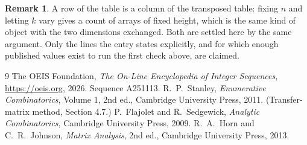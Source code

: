 \documentclass[11pt,a4paper]{article}
\theoremstyle{plain}
\theoremstyle{definition}
\newtheorem{remark}[theorem]{Remark}
\begin{document}
\begin{remark}
A row of the table is a column of the transposed table: fixing $n$ and letting $k$ vary gives a
count of arrays of fixed height, which is the same kind of object with the two dimensions
exchanged. Both are settled here by the same argument. Only the lines the entry states
explicitly, and for which enough published values exist to run the first check above, are
claimed.
\end{remark}

\begin{thebibliography}{9}
 The OEIS Foundation, \emph{The On-Line Encyclopedia of Integer
Sequences}, \url{https://oeis.org}, 2026. Sequence A251113.
 R.~P.~Stanley, \emph{Enumerative Combinatorics}, Volume 1, 2nd ed.,
Cambridge University Press, 2011. (Transfer-matrix method, Section 4.7.)
 P.~Flajolet and R.~Sedgewick, \emph{Analytic Combinatorics}, Cambridge
University Press, 2009.
 R.~A.~Horn and C.~R.~Johnson, \emph{Matrix Analysis}, 2nd ed., Cambridge
University Press, 2013.
\end{thebibliography}
\end{document}
